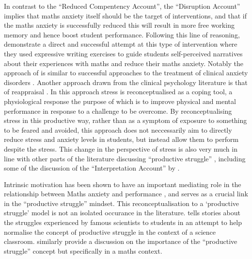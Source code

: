 \documentclass[twoside,12pt,a4paper]{report}
\begin{document}
In contrast to the ``Reduced Compentency Account'', the ``Disruption Account'' implies that maths anxiety itself should be the target of interventions, and that if the maths anxiety is successfully reduced this will result in more free working memory and hence boost student performance. Following this line of reasoning,  demonstrate a direct and successful attempt at this type of intervention where they used expressive writing exercises to guide students self-perceived narratives about their experiences with maths and reduce their maths anxiety. Notably the approach of  is similar to successful approaches to the treatment of clinical anxiety disorders \cite{McNally2007, Becker2007,Foa2005}. Another approach drawn from the clinical psychology literature is that of reappraisal \cite{Jamieson2016}. In this approach stress is reconceptualised as a coping tool, a physiological response the purpose of which is to improve physical and mental performance in response to a challenge to be overcome. By reconceptualising stress in this productive way, rather than as a symptom of exposure to something to be feared and avoided, this approach does not neccessarily aim to directly reduce stress and anxiety levels in students, but instead allow them to perform despite the stress. This change in the perspective of stress is also very much in line with other parts of the literature discussing ``productive struggle'' \cite{Wang2015}, including some of the discussion of the ``Interpretation Account'' by .

Intrinsic motivation has been shown to have an important mediating role in the relationship between Maths anxiety and performance \cite{Wang2015}, and serves as a crucial link in the ``productive struggle'' mindset. This reconceptualisation to a `productive struggle' model is not an isolated occurance in the literature.  tells stories about the struggles experienced by famous scientists to students in an attempt to help normalise the concept of productive struggle in the context of a science classroom.  similarly provide a discussion on the importance of the ``productive struggle'' concept but specifically in a maths context.
\end{document}
